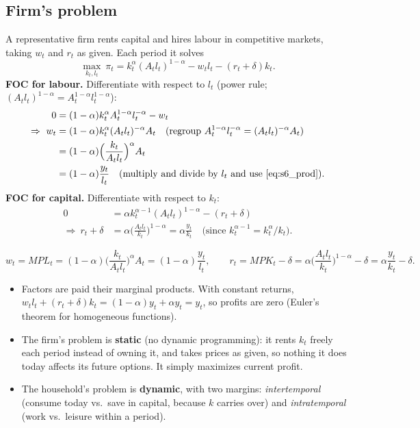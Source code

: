 \subsection{Firm's problem }

A representative firm rents capital and hires labour in competitive markets, taking $w_t$ and $r_t$ as given. Each period it solves
\[
\max_{k_t,l_t}\ \pi_t=k_t^{\alpha}(A_tl_t)^{1-\alpha}-w_tl_t-(r_t+\delta)k_t .
\]
\textbf{FOC for labour.} Differentiate with respect to $l_t$ (power rule; $(A_tl_t)^{1-\alpha}=A_t^{1-\alpha}l_t^{1-\alpha}$):
\begin{align*}
0&=(1-\alpha)k_t^{\alpha}A_t^{1-\alpha}l_t^{-\alpha}-w_t\\
\Rightarrow\ w_t&=(1-\alpha)k_t^{\alpha}(A_tl_t)^{-\alpha}A_t \quad\text{(regroup }A_t^{1-\alpha}l_t^{-\alpha}=(A_tl_t)^{-\alpha}A_t)\\
&=(1-\alpha)\Big(\frac{k_t}{A_tl_t}\Big)^{\alpha}A_t\\
&=(1-\alpha)\frac{y_t}{l_t}\quad\text{(multiply and divide by }l_t\text{ and use \eqref{eq:s6_prod})}.
\end{align*}
\textbf{FOC for capital.} Differentiate with respect to $k_t$:
\begin{align*}
0&=\alpha k_t^{\alpha-1}(A_tl_t)^{1-\alpha}-(r_t+\delta)\\
\Rightarrow\ r_t+\delta&=\alpha\Big(\frac{A_tl_t}{k_t}\Big)^{1-\alpha}=\alpha\frac{y_t}{k_t}
\quad\text{(since }k_t^{\alpha-1}=k_t^{\alpha}/k_t).
\end{align*}
\begin{keybox}[title=Factor prices]
\begin{equation}\label{eq:s6_prices}
w_t=MPL_t=(1-\alpha)\Big(\frac{k_t}{A_tl_t}\Big)^{\alpha}A_t=(1-\alpha)\frac{y_t}{l_t},
\qquad
r_t=MPK_t-\delta=\alpha\Big(\frac{A_tl_t}{k_t}\Big)^{1-\alpha}-\delta=\alpha\frac{y_t}{k_t}-\delta .
\end{equation}
\end{keybox}
\begin{itemize}
  \item Factors are paid their marginal products. With constant returns, $w_tl_t+(r_t+\delta)k_t=(1-\alpha)y_t+\alpha y_t=y_t$, so profits are zero (Euler's theorem for homogeneous functions).
  \item The firm's problem is \textbf{static} (no dynamic programming): it rents $k_t$ freely each period instead of owning it, and takes prices as given, so nothing it does today affects its future options. It simply maximizes current profit.
  \item The household's problem is \textbf{dynamic}, with two margins: \emph{intertemporal} (consume today vs.\ save in capital, because $k$ carries over) and \emph{intratemporal} (work vs.\ leisure within a period).
\end{itemize}

